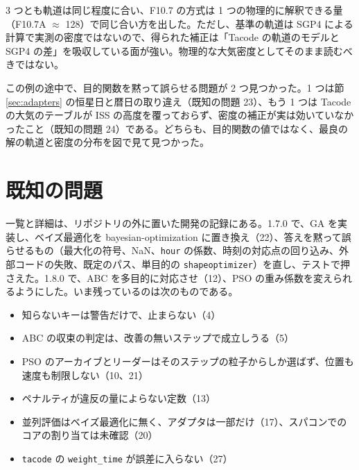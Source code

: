 \documentclass[11pt,a4paper,dvipdfmx]{jsarticle}
\begin{document}
3 つとも軌道は同じ程度に合い、F10.7 の方式は 1 つの物理的に解釈できる量（F10.7A $\approx$ 128）で同じ合い方を出した。ただし、基準の軌道は SGP4 による計算で実測の密度ではないので、得られた補正は「Tacode の軌道のモデルと SGP4 の差」を吸収している面が強い。物理的な大気密度としてそのまま読むべきではない。

この例の途中で、目的関数を黙って誤らせる問題が 2 つ見つかった。1 つは節 \ref{sec:adapters} の恒星日と暦日の取り違え（既知の問題 23）、もう 1 つは Tacode の大気のテーブルが ISS の高度を覆っておらず、密度の補正が実は効いていなかったこと（既知の問題 24）である。どちらも、目的関数の値ではなく、最良の解の軌道と密度の分布を図で見て見つかった。

\section{既知の問題}\label{sec:known-issues}

一覧と詳細は、リポジトリの外に置いた開発の記録にある。1.7.0 で、GA を実装し、ベイズ最適化を bayesian-optimization に置き換え（22）、答えを黙って誤らせるもの（最大化の符号、NaN、\texttt{hour} の係数、時刻の対応点の回り込み、外部コードの失敗、既定のパス、単目的の \texttt{shapeoptimizer}）を直し、テストで押さえた。1.8.0 で、ABC を多目的に対応させ（12）、PSO の重み係数を変えられるようにした。いま残っているのは次のものである。

\begin{itemize}
\item 知らないキーは警告だけで、止まらない（4）
\item ABC の収束の判定は、改善の無いステップで成立しうる（5）
\item PSO のアーカイブとリーダーはそのステップの粒子からしか選ばず、位置も速度も制限しない（10、21）
\item ペナルティが違反の量によらない定数（13）
\item 並列評価はベイズ最適化に無く、アダプタは一部だけ（17）、スパコンでのコアの割り当ては未確認（20）
\item \texttt{tacode} の \texttt{weight\_time} が誤差に入らない（27）
\end{itemize}
\end{document}
